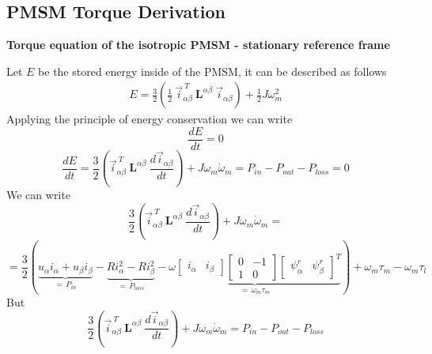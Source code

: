\documentclass[11pt,a4paper,oneside]{book}
\numberwithin{equation}{section}
\theoremstyle{it}
\theoremstyle{definition}
\begin{document}
\subsection{PMSM Torque Derivation}
\textbf{Torque equation of the isotropic PMSM - stationary reference 
	frame}

Let $E$ be the stored energy inside of the PMSM, it can be described as 
follows
\begin{equation*}
	\begin{aligned}
		E = \frac{3}{2} \left(\frac{1}{2}\ \vec{i}_{\alpha\beta}^{\ T}\ 
		\mathbf{L}^{\alpha\beta}\ \vec{i}_{\alpha\beta}\right) 
		+\frac{1}{2}J\omega_m^2
	\end{aligned} 
\end{equation*}
Applying the principle of energy conservation we can write
\begin{equation*}
	\frac{dE}{dt} = 0
\end{equation*}
\begin{equation*}
	\frac{dE}{dt} = \frac{3}{2} \left( \vec{i}_{\alpha\beta}^{\ T}\ 
	\mathbf{L}^{\alpha\beta}\ \frac{d\vec{i}_{\alpha\beta}}{dt}\right) + 
	J\omega_m\dot{\omega}_m= P_{in}-P_{out}-P_{loss} = 0
\end{equation*}
We can write
\begin{equation*}
	\frac{3}{2} \left( \vec{i}_{\alpha\beta}^{\ T}\ 
	\mathbf{L}^{\alpha\beta}\ \frac{d\vec{i}_{\alpha\beta}}{dt}\right) + 
	J\omega_m\dot{\omega}_m =
\end{equation*}
\begin{equation*}
	=\frac{3}{2}\left( \underbrace{u_\alpha i_\alpha+u_\beta 
		i_\beta}_{=\,P_{in}}-\underbrace{Ri_\alpha^2-Ri_\beta^2}_{=\,P_{loss}}- 
	\underbrace{\omega
		\begin{bmatrix} i_\alpha & i_\beta \end{bmatrix}
		\begin{bmatrix} 0 & -1 \\ 1 & 0\end{bmatrix}
		\begin{bmatrix} \psi^r_\alpha & \psi^r_\beta \end{bmatrix}^T
	}_{=\,\omega_m\tau_m}\right)  +\omega_m\tau_m-\omega_m\tau_l
\end{equation*}
But 
\begin{equation*}
	\frac{3}{2} \left( \vec{i}_{\alpha\beta}^{\ T}\ 
	\mathbf{L}^{\alpha\beta}\ \frac{d\vec{i}_{\alpha\beta}}{dt}\right) + 
	J\omega_m\dot{\omega}_m= P_{in}-P_{out}-P_{loss}
\end{equation*}
\end{document}

